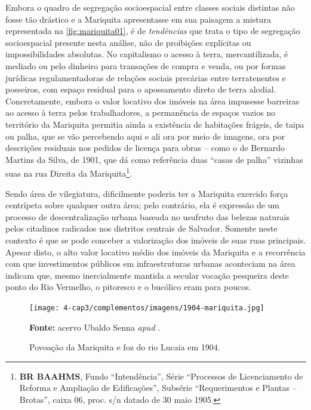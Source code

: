 
Embora o quadro de segregação socioespacial entre classes sociais distintas não fosse tão drástico e a Mariquita apresentasse em sua paisagem a mistura representada na \autoref{fig:mariquita01}, é de \textit{tendências} que trata o tipo de segregação socioespacial presente nesta análise, não de proibições explícitas ou impossibilidades absolutas. No capitalismo o acesso à terra, mercantilizada, é mediado ou pelo dinheiro para transações de compra e venda, ou por formas jurídicas regulamentadoras de relações sociais precárias entre terratenentes e posseiros, com espaço residual para o apossamento direto de terra alodial. Concretamente, embora o valor locativo dos imóveis na área impusesse barreiras ao acesso à terra pelos trabalhadores, a permanência de espaços vazios no território da Mariquita permitia ainda a existência de habitações frágeis, de taipa ou palha, que se vão percebendo aqui e ali ora por meio de imagens, ora por descrições residuais nos pedidos de licença para obras -- como o de Bernardo Martins da Silva, de 1901, que dá como referência duas ``casas de palha'' vizinhas suas na rua Direita da Mariquita\footnote{\textbf{BR BAAHMS}, Fundo ``Intendência'', Série ``Processos de Licenciamento de Reforma e Ampliação de Edificações'', Subsérie ``Requerimentos e Plantas -- Brotas'', caixa 06, proc. s/n datado de 30 maio 1905.}.

Sendo área de vilegiatura, dificilmente poderia ter a Mariquita exercido força centrípeta sobre qualquer outra área; pelo contrário, ela é expressão de um processo de descentralização urbana baseada no usufruto das belezas naturais pelos citadinos radicados nos distritos centrais de Salvador. Somente neste contexto é que se pode conceber a valorização dos imóveis de suas ruas principais. Apesar disto, o alto valor locativo médio dos imóveis da Mariquita e a recorrência com que investimentos públicos em infraestruturas urbanas aconteciam na área indicam que, mesmo inercialmente mantida a secular vocação pesqueira deste ponto do Rio Vermelho, o pitoresco e o bucólico eram para poucos. 


\begin{figure}[!htp]
\centering
\caption{Povoação da Mariquita e foz do rio Lucaia em 1904.}\texttt{[image: 4-cap3/complementos/imagens/1904-mariquita.jpg]}{\par \footnotesize \textbf{Fonte:} acervo Ubaldo Senna \textit{apud} . }
\label{fig:mariquita01}
\end{figure}

